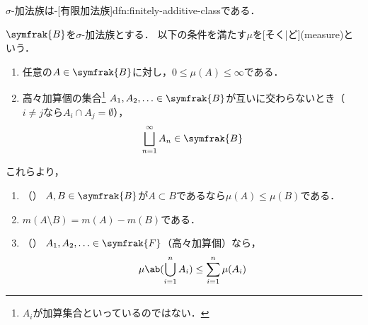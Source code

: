 \documentclass[../sotsu.tex]{subfiles}
\begin{document}
$\sigma$-加法族は-[有限加法族]{dfn:finitely-additive-class}である．



\begin{definition}
    $\symfrak{B}$を$\sigma$-加法族とする．
    以下の条件を満たす$\mu$を[そく|ど](measure)という．
    \begin{enumerate}
        \item 任意の$A \in \symfrak{B}$に対し，$0 \leq \mu(A) \leq \infty$である．
        \item 高々加算個の集合\footnote{$A_i$が加算集合といっているのではない．}%
            $A_1, A_2, \dotsc \in \symfrak{B}$が互いに交わらないとき（$i \neq j$なら$A_i \cap A_j = \emptyset$），
            \[  \bigsqcup_{n=1}^{\infty} A_n  \in  \symfrak{B}  \]
    \end{enumerate}
    これらより，
    \begin{enumerate}[resume]
        \item \label{content-measure:monotonicity}（）
            $A, B \in \symfrak{B}$が$A \subset B$であるなら$\mu(A) \leq \mu(B)$である．
        \item $m(A \setminus B) = m(A) - m(B)$である．
        \item \label{content-measure:subadditivity}（）
            $A_1, A_2, \dotsc \in \symfrak{F}$（高々加算個）なら，
            \begin{equation*}
                \mu \ab( \bigcup_{i=1}^{n} A_i ) \leq \sum_{i=1}^{n} \mu(A_i)
            \end{equation*}
    \end{enumerate}
\end{definition}
\end{document}
